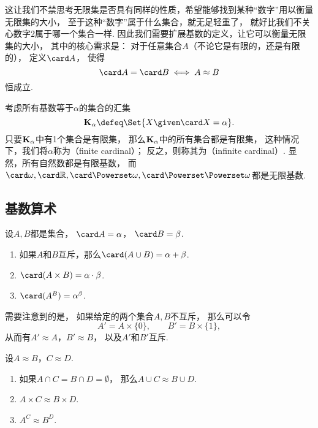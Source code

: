 这让我们不禁思考无限集是否具有同样的性质，希望能够找到某种“数字”用以衡量无限集的大小，
至于这种“数字”属于什么集合，就无足轻重了，
就好比我们不关心数字\(2\)属于哪一个集合一样.
因此我们需要扩展基数的定义，让它可以衡量无限集的大小，
其中的核心需求是：
对于任意集合\(A\)（不论它是有限的，还是有限的），
定义\(\card A\)，
使得\begin{equation*}
	\card A = \card B
	\iff
	A \approx B
\end{equation*}恒成立.

考虑所有基数等于\(\alpha\)的集合的汇集\begin{equation*}
	\Ka \defeq \Set{ X \given \card X = \alpha }.
\end{equation*}
只要\(\mathbf{K}_\alpha\)中有1个集合是有限集，
那么\(\mathbf{K}_\alpha\)中的所有集合都是有限集，
这种情况下，我们将\(\alpha\)称为（finite cardinal）；
反之，则称其为（infinite cardinal）.
显然，所有自然数都是有限基数，
而\(\card\omega,
\card\mathbb{R},
\card\Powerset\omega,
\card\Powerset\Powerset\omega\)都是无限基数.

\subsection{基数算术}
\begin{definition}\label{definition:基数.基数算术的定义}
设\(A,B\)都是集合，
\(\card A = \alpha\)，
\(\card B = \beta\).
\begin{enumerate}
	\item 如果\(A\)和\(B\)互斥，那么\(\card(A \cup B)=\alpha+\beta\).
	\item \(\card(A \times B)=\alpha\cdot\beta\).
	\item \(\card(A^B)=\alpha^\beta\).
\end{enumerate}
\end{definition}

需要注意到的是，
如果给定的两个集合\(A,B\)不互斥，
那么可以令\begin{equation*}
	A' = A\times\{0\}, \qquad
	B' = B\times\{1\},
\end{equation*}
从而有\(A' \approx A\)，\(B' \approx B\)，
以及\(A'\)和\(B'\)互斥.

\begin{theorem}
设\(A \approx B\)，\(C \approx D\).
\begin{enumerate}
	\item 如果\(A \cap C = B \cap D = \emptyset\)，
	那么\(A \cup C \approx B \cup D\).
	\item \(A \times C \approx B \times D\).
	\item \(A^C \approx B^D\).
\end{enumerate}
\end{theorem}

